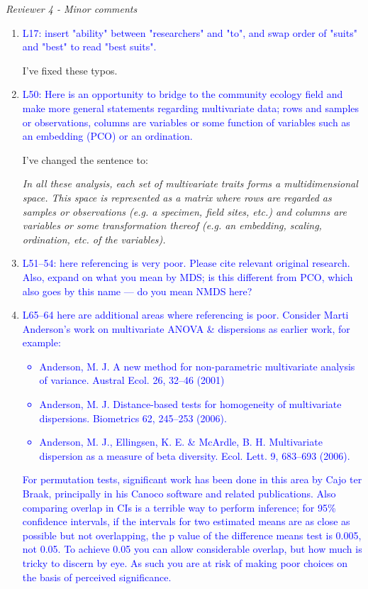 \documentclass[12pt,letterpaper]{article}
\renewcommand{\subsection}[1]{%
\bigskip
\begin{center}
\begin{large}
\normalfont\itshape #1
\end{large}
\end{center}}
\begin{document}
\subsection{Reviewer 4 - Minor comments}

\begin{enumerate}

\item{\textcolor{blue}{L17: insert "ability" between "researchers" and "to", and swap order of "suits" and "best" to read "best suits".}}

I've fixed these typos.

\item{\textcolor{blue}{L50: Here is an opportunity to bridge to the community ecology field and make more general statements regarding multivariate data; rows and samples or observations, columns are variables or some function of variables such as an embedding (PCO) or an ordination.}}

I've changed the sentence to:

\textit{In all these analysis, each set of multivariate traits forms a multidimensional space. This space is represented as a matrix where rows are regarded as samples or observations (e.g. a specimen, field sites, etc.) and columns are variables or some transformation thereof (e.g. an embedding, scaling, ordination, etc. of the variables).}

\item{\textcolor{blue}{L51--54: here referencing is very poor. Please cite relevant original research. Also, expand on what you mean by MDS; is this different from PCO, which also goes by this name --- do you mean NMDS here?}}


\item{\textcolor{blue}{L65--64 here are additional areas where referencing is poor. Consider Marti Anderson's work on multivariate ANOVA \& dispersions as earlier work, for example:
\begin{itemize}
\item Anderson, M. J. A new method for non-parametric multivariate analysis of variance. Austral Ecol. 26, 32–46 (2001)
\item Anderson, M. J. Distance-based tests for homogeneity of multivariate dispersions. Biometrics 62, 245–253 (2006).
\item Anderson, M. J., Ellingsen, K. E. \& McArdle, B. H. Multivariate dispersion as a measure of beta diversity. Ecol. Lett. 9, 683–693 (2006).
\end{itemize}
}}
\textcolor{blue}{For permutation tests, significant work has been done in this area by Cajo ter Braak, principally in his Canoco software and related publications.
Also comparing overlap in CIs is a terrible way to perform inference; for 95\% confidence intervals, if the intervals for two estimated means are as close as possible but not overlapping, the p value of the difference means test is 0.005, not 0.05. To achieve 0.05 you can allow considerable overlap, but how much is tricky to discern by eye.
As such you are at risk of making poor choices on the basis of perceived significance.}


\end{enumerate}
\end{document}
